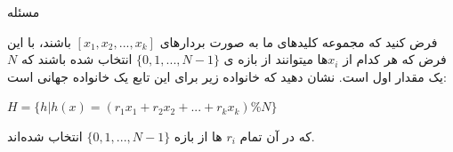 ‌مسئله

فرض کنید که مجموعه کلیدهای ما به صورت بردارهای $[x_{1}, x_{2}, ..., x_{k}]$ باشند، با این فرض که هر کدام از $x_{i}$ها میتوانند از بازه ی $\{0, 1, ..., N - 1\}$ انتخاب شده باشند که $N$ یک مقدار اول است. نشان دهید که خانواده زیر برای این تابع یک خانواده جهانی است:

\begin{flushleft}
	$H = \{h|h(x) = (r_{1}x_{1} + r_{2}x_{2} + ... + r_{k}x_{k}) \% N\}$
\end{flushleft}

که در آن تمام $r_{i}$ ها از بازه $\{0, 1, ..., N - 1\}$ انتخاب شده‌اند.
